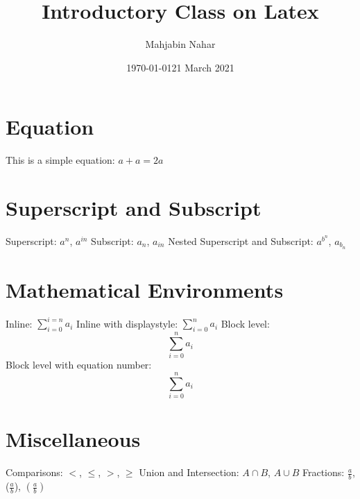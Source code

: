 \documentclass[12pt, a4paper]{article} %
\title{Introductory Class on Latex}
\author{Mahjabin Nahar}
\date{\today}
\date{21 March 2021}
\begin{document}
\maketitle
\tableofcontents %
\pagebreak %

\section{Equation}
This is a simple equation: $a + a = 2a$

\section{Superscript and Subscript}
Superscript: $a^n$, $a^{in}$
\newline
Subscript: $a_n$, $a_{in}$
\newline
Nested Superscript and Subscript: $a^{b^n}$, $a_{b_n}$

\section{Mathematical Environments}
Inline: $\sum_{i=0}^{i=n} a_i$
\newline
Inline with displaystyle: $\displaystyle\sum_{i=0}^n a_i$
\newline
Block level: $$\sum_{i=0}^n a_i$$
\newline
Block level with equation number:
\begin{equation}
\sum_{i=0}^n a_i
\end{equation}

\section{Miscellaneous}
Comparisons:
$ <$, $ \leq $, $ > $, $\geq $
\newline
Union and Intersection:
$A \cap B$, $A \cup B$
\newline
Fractions: $\frac{a}{b}$, ($\frac{a}{b}$), $\left(\frac{a}{b}\right)$
\end{document}
